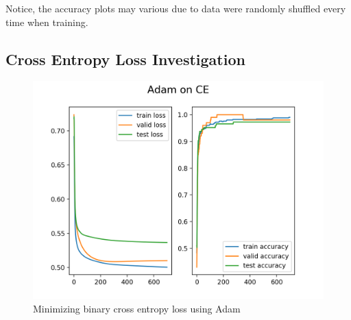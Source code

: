 \documentclass[10pt,letterpaper]{article}
\begin{document}
Notice, the accuracy plots may various due to data were randomly shuffled every time when training. \\


\subsection{Cross Entropy Loss Investigation}

\begin{figure}[H]
\centering
 \begin{subfig}
  \includegraphics[width=.45\linewidth]{adam_CE.png}\hfill
  \caption{Minimizing binary cross entropy loss using Adam}
  \end{subfig}
\end{figure}
\end{document}
